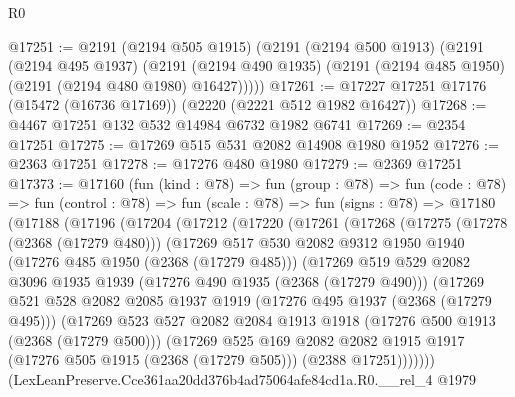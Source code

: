 \begin{lexlean}{R0}
\begin{coremodule}
@17251 := @2191
    (@2194 @505 @1915)
    (@2191
      (@2194 @500 @1913)
      (@2191
        (@2194 @495 @1937)
        (@2191 (@2194 @490 @1935) (@2191 (@2194 @485 @1950) (@2191 (@2194 @480 @1980) @16427)))))
@17261 := @17227 @17251 @17176 (@15472 (@16736 @17169)) (@2220 (@2221 @512 @1982 @16427))
@17268 := @4467 @17251 @132 @532 @14984 @6732 @1982 @6741
@17269 := @2354 @17251
@17275 := @17269 @515 @531 @2082 @14908 @1980 @1952
@17276 := @2363 @17251
@17278 := @17276 @480 @1980
@17279 := @2369 @17251
@17373 := @17160
    (fun (kind : @78) =>
    fun (group : @78) =>
    fun (code : @78) =>
    fun (control : @78) =>
    fun (scale : @78) =>
    fun (signs : @78) =>
    @17180
      (@17188
        (@17196
          (@17204
            (@17212
              (@17220
                (@17261
                  (@17268
                    (@17275
                      (@17278 (@2368 (@17279 @480)))
                      (@17269
                        @517
                        @530
                        @2082
                        @9312
                        @1950
                        @1940
                        (@17276 @485 @1950 (@2368 (@17279 @485)))
                        (@17269
                          @519
                          @529
                          @2082
                          @3096
                          @1935
                          @1939
                          (@17276 @490 @1935 (@2368 (@17279 @490)))
                          (@17269
                            @521
                            @528
                            @2082
                            @2085
                            @1937
                            @1919
                            (@17276 @495 @1937 (@2368 (@17279 @495)))
                            (@17269
                              @523
                              @527
                              @2082
                              @2084
                              @1913
                              @1918
                              (@17276 @500 @1913 (@2368 (@17279 @500)))
                              (@17269
                                @525
                                @169
                                @2082
                                @2082
                                @1915
                                @1917
                                (@17276 @505 @1915 (@2368 (@17279 @505)))
                                (@2388 @17251)))))))
                    (LexLeanPreserve.Cce361aa20dd376b4ad75064afe84cd1a.R0.__rel_4
                      @1979

\end{coremodule}
\end{lexlean}
